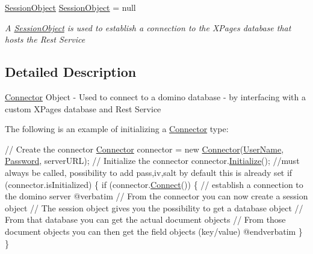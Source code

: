 \begin{DoxyCompactItemize}
\mbox{\hyperlink{class_session_object}{Session\+Object}} \mbox{\hyperlink{class_connector_a0a7bb42f9530796c086ab50785147ce9}{Session\+Object}} = null
\begin{DoxyCompactList}\small\item\em A \mbox{\hyperlink{class_session_object}{Session\+Object}} is used to establish a connection to the X\+Pages database that hosts the Rest Service \end{DoxyCompactList}\end{DoxyCompactItemize}


\subsection{Detailed Description}
\mbox{\hyperlink{class_connector}{Connector}} Object -\/ Used to connect to a domino database -\/ by interfacing with a custom X\+Pages database and Rest Service 

The following is an example of initializing a {\ttfamily \mbox{\hyperlink{class_connector}{Connector}}} type\+: 
\begin{DoxyCode}
    \textcolor{comment}{// Create the connector}
    \mbox{\hyperlink{class_connector}{Connector}} connector = \textcolor{keyword}{new} \mbox{\hyperlink{class_connector_a259c6d94252479cc3028038ebbaa7dc8}{Connector}}(\mbox{\hyperlink{class_connector_a41d247f09774f0ed206ce1a4a2463fed}{UserName}}, 
      \mbox{\hyperlink{class_connector_a7dd469898462ef761d256392766461fe}{Password}}, serverURL);
    \textcolor{comment}{// Initialize the connector}
    connector.\mbox{\hyperlink{class_connector_a376c1ed70efd33d0bb18bb36e5cf076e}{Initialize}}();
    \textcolor{comment}{//must always be called, possibility to add pass,iv,salt by default this is already set}
    \textcolor{keywordflow}{if} (connector.isInitialized) \{
        \textcolor{keywordflow}{if} (connector.\mbox{\hyperlink{class_connector_a0dcf8f969c37c4306c567417a872329a}{Connect}}()) \{  \textcolor{comment}{// establish a connection to the domino server}
@verbatim
\textcolor{comment}{// From the connector you can now create a session object}
\textcolor{comment}{// The session object gives you the possibility to get a database object}
\textcolor{comment}{// From that database you can get the actual document objects}
\textcolor{comment}{// From those document objects you can then get the field objects (key/value)}
\textcolor{keyword}{@end}verbatim
        \}
    \}
\end{DoxyCode}
 

